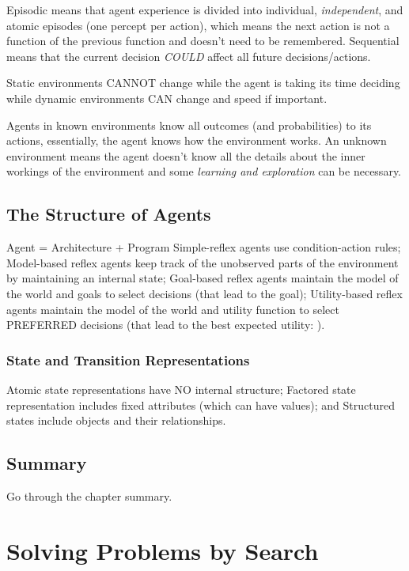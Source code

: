 \documentclass[exam={Midterm},color=true]{cs581exam}
\begin{document}
Episodic means that agent experience is divided into individual, \emph{independent}, and atomic episodes (one percept per action),
which means the next action is not a function of the previous function and doesn't need to be remembered.
Sequential means that the current decision \emph{COULD} affect all future decisions/actions.

Static environments CANNOT change while the agent is taking its time deciding while dynamic environments CAN change and speed if important.

Agents in known environments know all outcomes (and probabilities) to its actions, essentially, the agent knows how the environment works.
An unknown environment means the agent doesn't know all the details about the inner workings of the environment and some \emph{learning and exploration} can be necessary.
%
\subsection{The Structure of Agents}\label{subsec:2.4}
Agent = Architecture + Program
Simple-reflex agents use condition-action rules;
Model-based reflex agents keep track of the unobserved parts of the environment by maintaining an internal state;
Goal-based reflex agents maintain the model of the world and goals to select decisions (that lead to the goal);
Utility-based reflex agents maintain the model of the world and utility function to select PREFERRED decisions (that lead to the best expected utility: ).

\subsubsection{State and Transition Representations}\label{subsubsec:state-and-transition-representations}
Atomic state representations have NO internal structure;
Factored state representation includes fixed attributes (which can have values);
and Structured states include objects and their relationships.

%
\subsection{Summary}\label{subsec:2-summary}
Go through the chapter summary.

\section{Solving Problems by Search}\label{sec:solving-problems-by-search}
\end{document}
